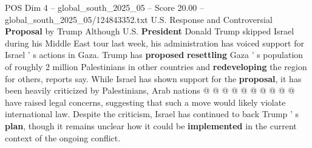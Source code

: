 \begin{textsample}{POS Dim 4 – global\_south\_2025\_05 – Score 20.00 – global\_south\_2025\_05/124843352.txt}
U.S.
Response and Controversial \textbf{Proposal} by Trump Although U.S. \textbf{President} Donald Trump skipped Israel during his Middle East tour last week, his administration has voiced support for Israel ' s actions in Gaza.
Trump has \textbf{proposed} \textbf{resettling} Gaza ' s population of roughly 2 million Palestinians in other countries and \textbf{redeveloping} the region for others, reports say.
While Israel has shown support for the \textbf{proposal}, it has been heavily criticized by Palestinians, Arab nations @ @ @ @ @ @ @ @ @ @ have raised legal concerns, suggesting that such a move would likely violate international law.
Despite the criticism, Israel has continued to back Trump ' s \textbf{plan}, though it remains unclear how it could be \textbf{implemented} in the current context of the ongoing conflict.

\end{textsample}
